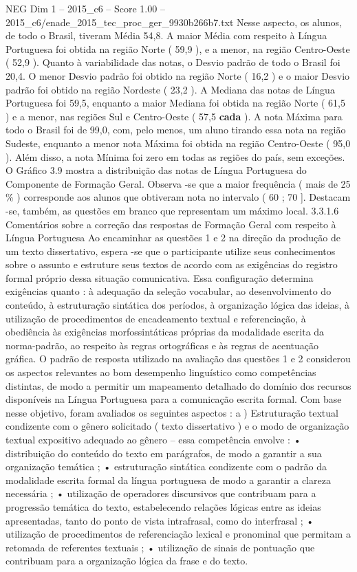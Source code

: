 \begin{textsample}{NEG Dim 1 – 2015\_c6 – Score 1.00 – 2015\_c6/enade\_2015\_tec\_proc\_ger\_9930b266b7.txt}
Nesse aspecto, os alunos, de todo o Brasil, tiveram Média 54,8.
A maior Média com respeito à Língua Portuguesa foi obtida na região Norte ( 59,9 ), e a menor, na região Centro-Oeste ( 52,9 ).
Quanto à variabilidade das notas, o Desvio padrão de todo o Brasil foi 20,4.
O menor Desvio padrão foi obtido na região Norte ( 16,2 ) e o maior Desvio padrão foi obtido na região Nordeste ( 23,2 ).
A Mediana das notas de Língua Portuguesa foi 59,5, enquanto a maior Mediana foi obtida na região Norte ( 61,5 ) e a menor, nas regiões Sul e Centro-Oeste ( 57,5 \textbf{cada} ).
A nota Máxima para todo o Brasil foi de 99,0, com, pelo menos, um aluno tirando essa nota na região Sudeste, enquanto a menor nota Máxima foi obtida na região Centro-Oeste ( 95,0 ).
Além disso, a nota Mínima foi zero em todas as regiões do país, sem exceções.
O Gráfico 3.9 mostra a distribuição das notas de Língua Portuguesa do Componente de Formação Geral.
Observa -se que a maior frequência ( mais de 25 \% ) corresponde aos alunos que obtiveram nota no intervalo ( 60 ; 70 ].
Destacam -se, também, as questões em branco que representam um máximo local. 3.3.1.6 Comentários sobre a correção das respostas de Formação Geral com respeito à Língua Portuguesa Ao encaminhar as questões 1 e 2 na direção da produção de um texto dissertativo, espera -se que o participante utilize seus conhecimentos sobre o assunto e estruture seus textos de acordo com as exigências do registro formal próprio dessa situação comunicativa.
Essa configuração determina exigências quanto : à adequação da seleção vocabular, ao desenvolvimento do conteúdo, à estruturação sintática dos períodos, à organização lógica das ideias, à utilização de procedimentos de encadeamento textual e referenciação, à obediência às exigências morfossintáticas próprias da modalidade escrita da norma-padrão, ao respeito às regras ortográficas e às regras de acentuação gráfica.
O padrão de resposta utilizado na avaliação das questões 1 e 2 considerou os aspectos relevantes ao bom desempenho linguístico como competências distintas, de modo a permitir um mapeamento detalhado do domínio dos recursos disponíveis na Língua Portuguesa para a comunicação escrita formal.
Com base nesse objetivo, foram avaliados os seguintes aspectos : a ) Estruturação textual condizente com o gênero solicitado ( texto dissertativo ) e o modo de organização textual expositivo adequado ao gênero – essa competência envolve : • distribuição do conteúdo do texto em parágrafos, de modo a garantir a sua organização temática ; • estruturação sintática condizente com o padrão da modalidade escrita formal da língua portuguesa de modo a garantir a clareza necessária ; • utilização de operadores discursivos que contribuam para a progressão temática do texto, estabelecendo relações lógicas entre as ideias apresentadas, tanto do ponto de vista intrafrasal, como do interfrasal ; • utilização de procedimentos de referenciação lexical e pronominal que permitam a retomada de referentes textuais ; • utilização de sinais de pontuação que contribuam para a organização lógica da frase e do texto.

\end{textsample}

